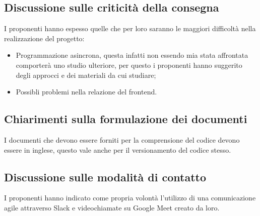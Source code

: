\documentclass[a4paper]{article}
\begin{document}
\subsection{Discussione sulle criticità della consegna}
I proponenti hanno espesso quelle che per loro saranno le maggiori difficoltà nella realizzazione del progetto:
\begin{itemize}
    \item Programmazione asincrona, questa infatti non essendo mia stata affrontata comporterà uno studio ulteriore, per questo i proponenti hanno suggerito degli approcci e dei materiali da cui studiare;
    \item Possibli problemi nella relazione del frontend.
\end{itemize}
\subsection{Chiarimenti sulla formulazione dei documenti}
I documenti che devono essere forniti per la comprensione del codice devono essere in inglese, questo vale anche per il versionamento del codice stesso.
\subsection{Discussione sulle modalità di contatto} 
I proponenti hanno indicato come propria volontà l'utilizzo di una comunicazione agile attraverso Slack e videochiamate su Google Meet creato da loro. 
\end{document}
